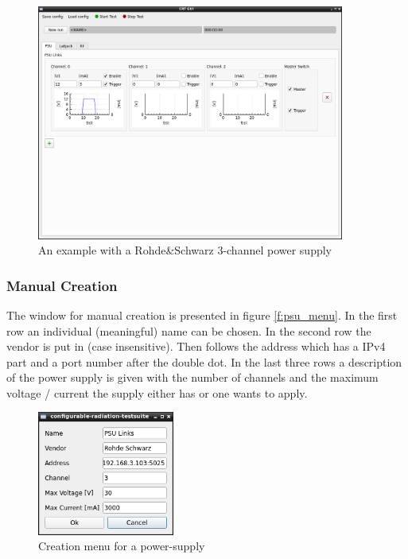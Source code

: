 \documentclass[10pt,a4paper]{article}
\begin{document}
	\begin{figure}[H]
\centering
\includegraphics[width=0.9\textwidth]{./2_PSU_example.png}
\caption{An example with a Rohde\&Schwarz 3-channel power supply}
\label{f:psu_example}
	\end{figure}	 
	
	\subsubsection{Manual Creation}	
	\label{c:psu_manual_creation}
	
	The window for manual creation is presented in figure \eqref{f:psu_menu}. In the first row an individual (meaningful) name can be chosen. In the second row the vendor is put in (case insensitive). Then follows the address which has a IPv4 part and a port number after the double dot. In the last three rows a description of the power supply is given with the number of channels and the maximum voltage / current the supply either has or one wants to apply.	
	
	\begin{figure}[H]
	\centering
	\includegraphics[width=0.4\textwidth]{./2_PSU_menu.png}
	\caption{Creation menu for a power-supply}
	\label{f:psu_menu}
	\end{figure}
	
\end{document}
